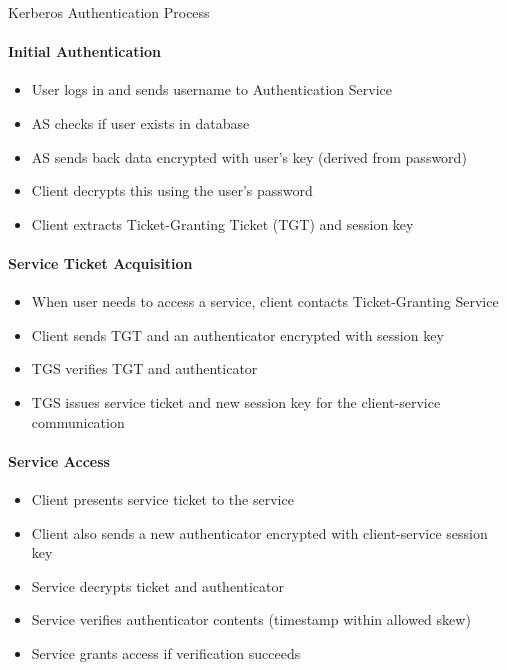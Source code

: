 \begin{KR}{Kerberos Authentication Process}\\
\paragraph{Initial Authentication}
\begin{itemize}
    \item User logs in and sends username to Authentication Service
    \item AS checks if user exists in database
    \item AS sends back data encrypted with user's key (derived from password)
    \item Client decrypts this using the user's password
    \item Client extracts Ticket-Granting Ticket (TGT) and session key
\end{itemize}

\paragraph{Service Ticket Acquisition}
\begin{itemize}
    \item When user needs to access a service, client contacts Ticket-Granting Service
    \item Client sends TGT and an authenticator encrypted with session key
    \item TGS verifies TGT and authenticator
    \item TGS issues service ticket and new session key for the client-service communication
\end{itemize}

\paragraph{Service Access}
\begin{itemize}
    \item Client presents service ticket to the service
    \item Client also sends a new authenticator encrypted with client-service session key
    \item Service decrypts ticket and authenticator
    \item Service verifies authenticator contents (timestamp within allowed skew)
    \item Service grants access if verification succeeds
\end{itemize}
\end{KR}

